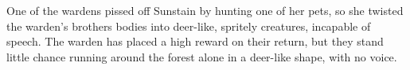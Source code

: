 \begin{multicols}{2}
\begin{itemize}
  One of the wardens pissed off Sunstain by hunting one of her pets, so she twisted the warden's brothers bodies into deer-like, spritely creatures, incapable of speech.
  The warden has placed a high reward on their return, but they stand little chance running around the forest alone in a deer-like shape, with no voice.
\end{itemize}

\hag

\showStdSpells

\vfill\null

\end{multicols}
